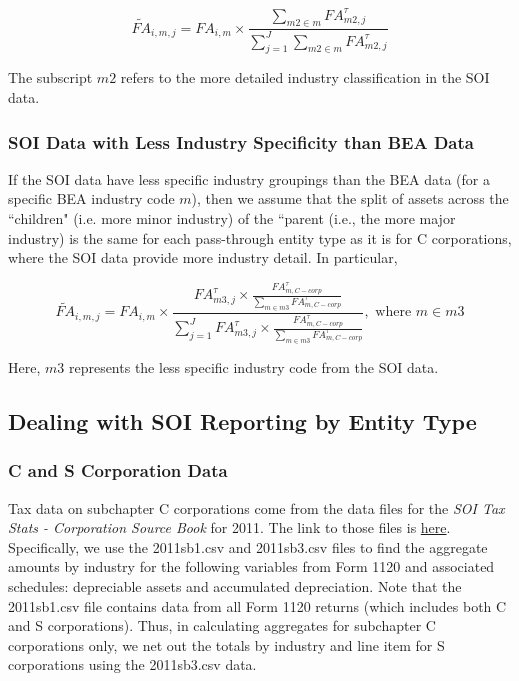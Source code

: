 \documentclass[article,11pt,letterpaper,fleqn]{article}
\theoremstyle{definition}
\numberwithin{equation}{section}
\begin{document}
\begin{equation}
\widetilde{FA}_{i,m,j} = FA_{i,m}\times \frac{\sum_{m2\in m}FA^{\tau}_{m2,j}}{\sum_{j=1}^{J} \sum_{m2\in m} FA^{\tau}_{m2,j}}
\end{equation}

The subscript $m2$ refers to the more detailed industry classification in the SOI data.  

\subsubsection{SOI Data with Less Industry Specificity than BEA Data}

If the SOI data have less specific industry groupings than the BEA data (for a specific BEA industry code $m$), then we assume that the split of assets across the ``children" (i.e. more minor industry) of the ``parent (i.e., the more major industry) is the same for each pass-through entity type as it is for C corporations, where the SOI data provide more industry detail.  In particular,

\begin{equation}
\widetilde{FA}_{i,m,j} = FA_{i,m}\times \frac{FA^{\tau}_{m3,j}\times \frac{FA^{\tau}_{m,C-corp}}{\sum_{m\in m3}FA^{\tau}_{m,C-corp}}}{\sum_{j=1}^{J} FA^{\tau}_{m3,j}\times \frac{FA^{\tau}_{m,C-corp}}{\sum_{m\in m3}FA^{\tau}_{m,C-corp}}}, \text{ where } m\in m3
\end{equation}

Here, $m3$ represents the less specific industry code from the SOI data.

\subsection{Dealing with SOI Reporting by Entity Type}

\subsubsection{C and S Corporation Data}
\label{sec:CandS}

Tax data on subchapter C corporations come from the data files for the \emph{SOI Tax Stats - Corporation Source Book} for 2011.  The link to those files is \href{http://www.irs.gov/uac/SOI-Tax-Stats-Corporation-Source-Book:-Data-File}{here}.  Specifically, we use the 2011sb1.csv and 2011sb3.csv files to find the aggregate amounts by industry for the following variables from Form 1120 and associated schedules: depreciable assets and accumulated depreciation.  Note that the 2011sb1.csv file contains data from all Form 1120 returns (which includes both C and S corporations).  Thus, in calculating aggregates for subchapter C corporations only, we net out the totals by industry and line item for S corporations using the 2011sb3.csv data.
\end{document}
